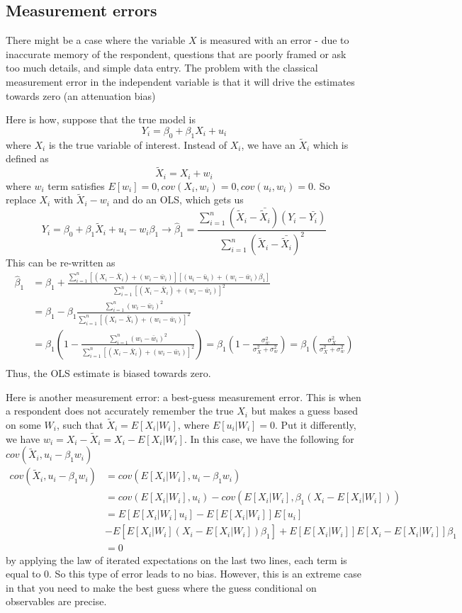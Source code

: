 \documentclass[12pt]{article}
\theoremstyle{definition}
\theoremstyle{property}
\theoremstyle{assumption}
\theoremstyle{example}
\theoremstyle{comment}
\begin{document}
\subsection{Measurement errors}
There might be a case where the variable $X$ is measured with an error - due to inaccurate memory of the respondent, questions that are poorly framed or ask too much details, and simple data entry. The problem with the classical measurement error in the independent variable is that it will drive the estimates towards zero (an attenuation bias)
\par
Here is how, suppose that the true model is 
\[
Y_i = \beta_0 + \beta_1X_i+ u_i
\]
where $X_i$ is the true variable of interest. Instead of $X_i$, we have an $\tilde{X}_i$ which is defined as
\[
\tilde{X}_i = X_i + w_i
\]
where $w_i$ term satisfies $E[w_i]=0, cov(X_i,w_i)=0, cov(u_i,w_i)=0$.  So replace $X_i$ with $\tilde{X}_i-w_i$ and do an OLS, which gets us
\[
Y_i = \beta_0 + \beta_1\tilde{X}_i+ u_i - w_i\beta_1 \to \hat{\beta}_1 = \frac{\sum_{i=1}^n(\tilde{X}_i-\bar{\tilde{X}_i})(Y_i-\bar{Y_i})}{\sum_{i=1}^n(\tilde{X}_i-\bar{\tilde{X}_i})^2}
\]
This can be re-written as
\[
\begin{aligned}
\hat{\beta}_1 
&=\beta_1+\frac{\sum_{i=1}^n[(X_i-\bar{X}_i)+(w_i-\bar{w}_i)][(u_i-\bar{u}_i)+(w_i-\bar{w}_i)\beta_1] }{\sum_{i=1}^n[(X_i-\bar{X}_i)+(w_i-\bar{w}_i)]^2} \\
&=\beta_1 - \beta_1\frac{\sum_{i=1}^n (w_i-\bar{w}_i)^2}{\sum_{i=1}^n[(X_i-\bar{X}_i)+(w_i-\bar{w}_i)]^2} \\
&=\beta_1 \left(1- \frac{\sum_{i=1}^n (w_i-\bar{w}_i)^2}{\sum_{i=1}^n[(X_i-\bar{X}_i)+(w_i-\bar{w}_i)]^2}\right) = \beta_1 \left(1-\frac{\sigma_w^2}{\sigma_X^2+\sigma_w^2} \right)=\beta_1\left(\frac{\sigma_X^2}{\sigma_X^2+\sigma_w^2} \right)\\
\end{aligned}
\]
Thus, the OLS estimate is biased towards zero.
\par

Here is another measurement error: a best-guess measurement error. This is when a respondent does not accurately remember the true $X_i$ but makes a guess based on some $W_i$, such that $\tilde{X}_i=E[X_i|W_i]$, where $E[u_i|W_i]=0$. Put it differently, we have $w_i = X_i-\tilde{X}_i = X_i-E[X_i|W_i]$. In this case, we have the following for $cov(\tilde{X}_i, u_i-\beta_1w_i)$
\[
\begin{aligned}
cov(\tilde{X}_i, u_i-\beta_1w_i)&=cov(E[X_i|W_i], u_i-\beta_1w_i)\\
&=cov(E[X_i|W_i], u_i)-cov(E[X_i|W_i], \beta_1(X_i-E[X_i|W_i]) )\\
&=E[E[X_i|W_i]u_i]-E[E[X_i|W_i]]E[u_i] \\
&- E[E[X_i|W_i](X_i-E[X_i|W_i])\beta_1] + E[E[X_i|W_i]]E[X_i-E[X_i|W_i]]\beta_1\\
&=0
\end{aligned}
\]
by applying the law of iterated expectations on the last two lines, each term is equal to 0. So this type of error leads to no bias. However, this is an extreme case in that you need to make the best guess where the guess conditional on observables are precise. 
\end{document}
